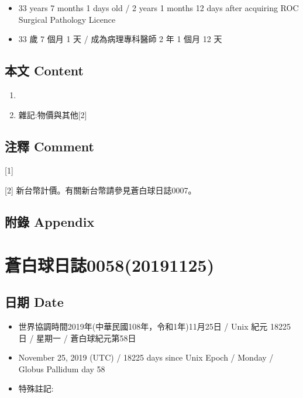 \documentclass[a5paper, 12pt
]{book}
\providecommand{\tightlist}{%
  \setlength{\itemsep}{0pt}\setlength{\parskip}{0pt}}
\begin{document}
\begin{itemize}
\tightlist
\item
  33 years 7 months 1 days old / 2 years 1 months 12 days after
  acquiring ROC Surgical Pathology Licence
\item
  33 歲 7 個月 1 天 / 成為病理專科醫師 2 年 1 個月 12 天
\end{itemize}

\hypertarget{ux672cux6587-content-56}{%
\subsection{本文 Content}\label{ux672cux6587-content-56}}

\begin{enumerate}
\def\labelenumi{\arabic{enumi}.}
\item
\item
  雜記:物價與其他{[}2{]}
\end{enumerate}

\hypertarget{ux6ce8ux91cb-comment-50}{%
\subsection{注釋 Comment}\label{ux6ce8ux91cb-comment-50}}

{[}1{]}

{[}2{]} 新台幣計價。有關新台幣請參見蒼白球日誌0007。

\hypertarget{ux9644ux9304-appendix-49}{%
\subsection{附錄 Appendix}\label{ux9644ux9304-appendix-49}}

\hypertarget{ux84bcux767dux7403ux65e5ux8a8c005820191125}{%
\section{蒼白球日誌0058(20191125)}\label{ux84bcux767dux7403ux65e5ux8a8c005820191125}}

\hypertarget{ux65e5ux671f-date-57}{%
\subsection{日期 Date}\label{ux65e5ux671f-date-57}}

\begin{itemize}
\tightlist
\item
  世界協調時間2019年(中華民國108年，令和1年)11月25日 / Unix 紀元 18225
  日 / 星期一 / 蒼白球紀元第58日
\item
  November 25, 2019 (UTC) / 18225 days since Unix Epoch / Monday /
  Globus Pallidum day 58
\item
  特殊註記:
\end{itemize}
\end{document}
